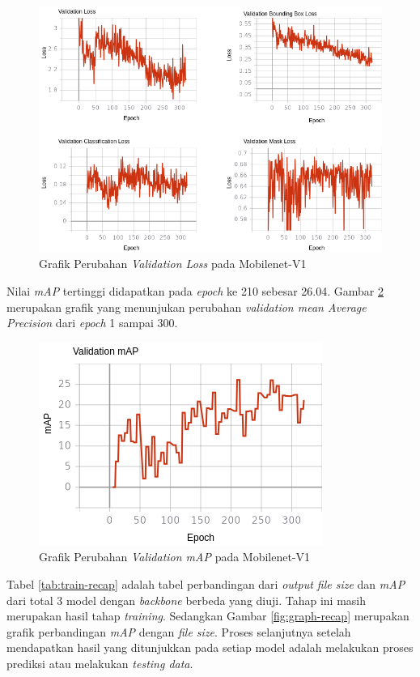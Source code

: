 \begin{figure}[h]
	\centering
	\includegraphics[scale=0.36]{gambar/mobilenetv1-val.png}
	\caption{Grafik Perubahan \textit{Validation Loss} pada Mobilenet-V1}
	\label{fig:mobilenetv1-val}
\end{figure}

Nilai \textit{mAP} tertinggi didapatkan pada \textit{epoch} ke 210 sebesar 26.04. Gambar \ref{fig:mobilenetv1-map} merupakan grafik yang menunjukan perubahan \textit{validation mean Average Precision} dari \textit{epoch} 1 sampai 300.

\newpage

\begin{figure}[h]
	\centering
	\includegraphics[scale=0.4]{gambar/mobilenetv1-map.png}
	\caption{Grafik Perubahan \textit{Validation mAP} pada Mobilenet-V1}
	\label{fig:mobilenetv1-map}
\end{figure} 

Tabel \ref{tab:train-recap} adalah tabel perbandingan dari \textit{output file size} dan \textit{mAP} dari total 3 model dengan \textit{backbone} berbeda yang diuji. Tahap ini masih merupakan hasil tahap \textit{training}. Sedangkan Gambar \ref{fig:graph-recap} merupakan grafik perbandingan \textit{mAP} dengan \textit{file size}. Proses selanjutnya setelah mendapatkan hasil yang ditunjukkan pada setiap model adalah melakukan proses prediksi atau melakukan \textit{testing data}.

